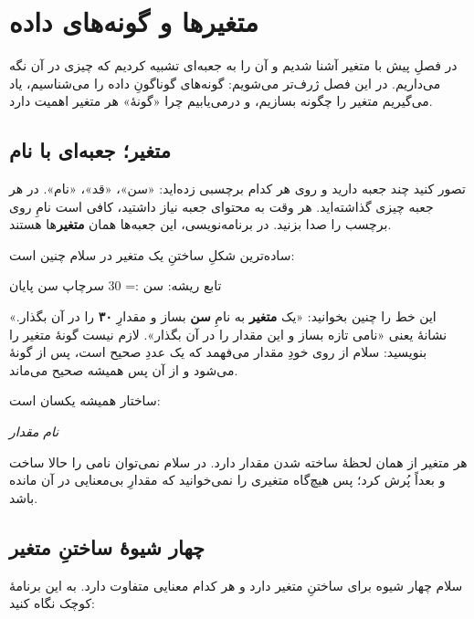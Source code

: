 \chapter{متغیرها و گونه‌های داده}%
\label{ch:variables}

در فصلِ پیش با متغیر آشنا شدیم و آن را به جعبه‌ای تشبیه کردیم که چیزی در آن
نگه می‌داریم. در این فصل ژرف‌تر می‌شویم: گونه‌های گوناگونِ داده را می‌شناسیم،
یاد می‌گیریم متغیر را چگونه بسازیم، و درمی‌یابیم چرا «گونهٔ» هر متغیر اهمیت
دارد.

\section{متغیر؛ جعبه‌ای با نام}

تصور کنید چند جعبه دارید و روی هر کدام برچسبی زده‌اید: «سن»، «قد»، «نام». در هر
جعبه چیزی گذاشته‌اید. هر وقت به محتوای جعبه نیاز داشتید، کافی است نامِ روی برچسب
را صدا بزنید. در برنامه‌نویسی، این جعبه‌ها همان \textbf{متغیر}ها هستند.

ساده‌ترین شکلِ ساختنِ یک متغیر در سلام چنین است:

\begin{salamfa}
تابع ریشه:
    سن := 30
    سرچاپ سن
پایان
\end{salamfa}

این خط را چنین بخوانید: «یک \textbf{متغیر} به نامِ \textbf{سن} بساز و مقدارِ
\textbf{۳۰} را در آن بگذار.» نشانهٔ \code{:=} یعنی «نامی تازه بساز و این مقدار را
در آن بگذار». لازم نیست گونهٔ متغیر را بنویسید: سلام از روی خودِ مقدار می‌فهمد که
 یک عددِ صحیح است، پس  از گونهٔ  می‌شود و از آن پس
همیشه صحیح می‌ماند.

ساختار همیشه یکسان است:

\begin{center}
\textit{نام} \code{:=} \textit{مقدار}
\end{center}

\begin{note}
هر متغیر از همان لحظهٔ ساخته شدن مقدار دارد. در سلام نمی‌توان نامی را حالا
ساخت و بعداً پُرش کرد؛ پس هیچ‌گاه متغیری را نمی‌خوانید که مقدارِ بی‌معنایی در
آن مانده باشد.
\end{note}

\section{چهار شیوهٔ ساختنِ متغیر}

سلام چهار شیوه برای ساختنِ متغیر دارد و هر کدام معنایی متفاوت دارد. به این
برنامهٔ کوچک نگاه کنید:

